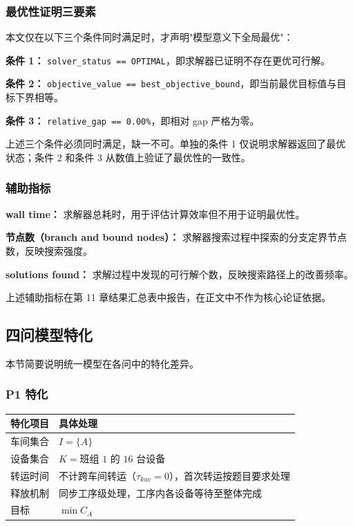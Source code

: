\documentclass[UTF8,a4paper,12pt]{ctexart}
\begin{document}
\subsubsection{最优性证明三要素}
本文仅在以下三个条件同时满足时，才声明"模型意义下全局最优"：

\textbf{条件 1：} \texttt{solver\_status == OPTIMAL}，即求解器已证明不存在更优可行解。

\textbf{条件 2：} \texttt{objective\_value == best\_objective\_bound}，即当前最优目标值与目标下界相等。

\textbf{条件 3：} \texttt{relative\_gap == 0.00\%}，即相对 gap 严格为零。

上述三个条件必须同时满足，缺一不可。单独的条件 1 仅说明求解器返回了最优状态；条件 2 和条件 3 从数值上验证了最优性的一致性。

\subsubsection{辅助指标}
\textbf{wall time：} 求解器总耗时，用于评估计算效率但不用于证明最优性。

\textbf{节点数（branch and bound nodes）：} 求解器搜索过程中探索的分支定界节点数，反映搜索强度。

\textbf{solutions found：} 求解过程中发现的可行解个数，反映搜索路径上的改善频率。

上述辅助指标在第 11 章结果汇总表中报告，在正文中不作为核心论证依据。

\subsection{四问模型特化}
本节简要说明统一模型在各问中的特化差异。

\subsubsection{P1 特化}
\begin{center}
\begin{tabular}{ll}
\toprule
特化项目 & 具体处理 \\
\midrule
车间集合 & $I = \{A\}$ \\
设备集合 & $K = \text{班组 1 的 16 台设备}$ \\
转运时间 & 不计跨车间转运（$\tau_{kuv} = 0$），首次转运按题目要求处理 \\
释放机制 & 同步工序级处理，工序内各设备等待至整体完成 \\
目标 & $\min C_A$ \\
\bottomrule
\end{tabular}
\end{center}
\end{document}
